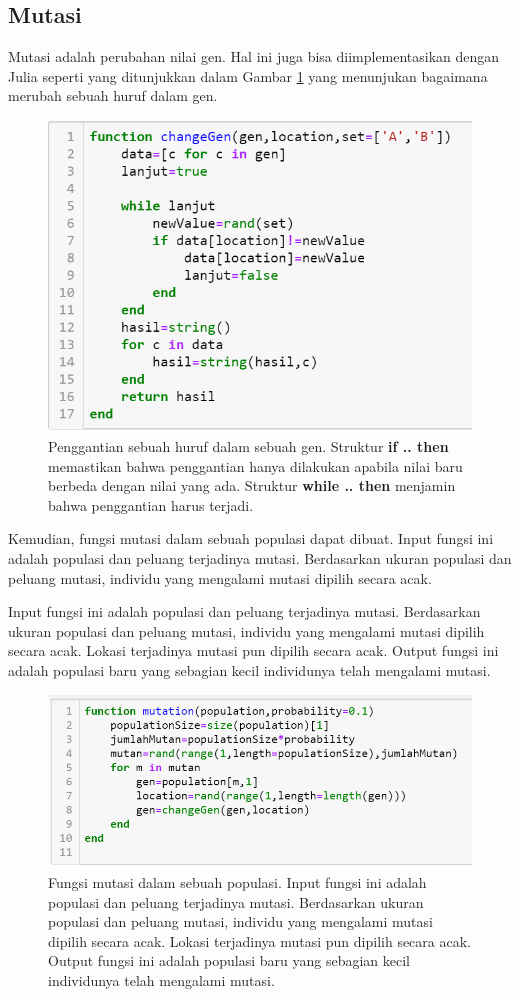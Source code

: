 \documentclass[12pt,a4paper]{memoir}
\begin{document}
\subsection{Mutasi}
Mutasi adalah perubahan nilai gen. Hal ini juga bisa diimplementasikan dengan Julia seperti yang ditunjukkan dalam Gambar \ref{fig:ga6} yang menunjukan bagaimana merubah sebuah huruf dalam gen.

\begin{figure}[h]
	\centering
	\includegraphics[width=0.7\linewidth]{images/ga6}
	\caption{Penggantian sebuah huruf dalam sebuah gen. Struktur \textbf{if .. then} memastikan bahwa penggantian hanya dilakukan apabila nilai baru berbeda dengan nilai yang ada. Struktur \textbf{while .. then} menjamin bahwa penggantian harus terjadi. }
	\label{fig:ga6}
\end{figure}

Kemudian, fungsi mutasi dalam sebuah populasi dapat dibuat. Input fungsi ini adalah populasi dan peluang terjadinya mutasi. Berdasarkan ukuran populasi dan peluang mutasi, individu yang  mengalami mutasi dipilih secara acak.


Input fungsi ini adalah populasi dan peluang terjadinya mutasi. Berdasarkan ukuran populasi dan peluang mutasi, individu yang  mengalami mutasi dipilih secara acak. Lokasi terjadinya mutasi pun dipilih secara acak. Output fungsi ini adalah populasi baru yang sebagian kecil individunya telah mengalami mutasi.
\begin{figure}
	\centering
	\includegraphics[width=\linewidth]{images/ga7}
	\caption{Fungsi mutasi dalam sebuah populasi. Input fungsi ini adalah populasi dan peluang terjadinya mutasi. Berdasarkan ukuran populasi dan peluang mutasi, individu yang  mengalami mutasi dipilih secara acak. Lokasi terjadinya mutasi pun dipilih secara acak. Output fungsi ini adalah populasi baru yang sebagian kecil individunya telah mengalami mutasi.}
	\label{fig:ga7}
\end{figure}
\end{document}
